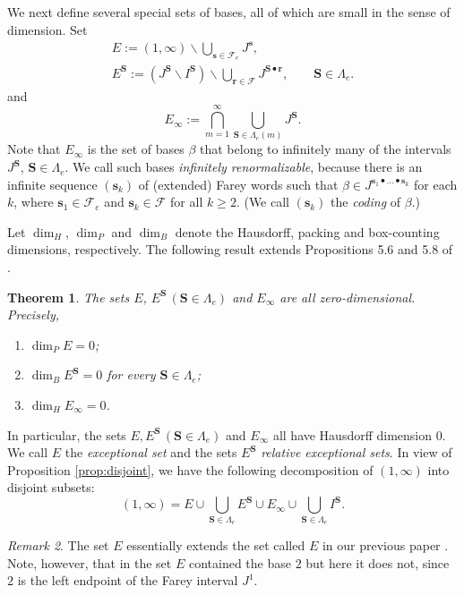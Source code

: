 \documentclass[12pt]{amsart}
\newtheorem{theorem}{Theorem}[section]
\theoremstyle{definition}
\theoremstyle{remark}
\newtheorem{remark}[theorem]{Remark}
\numberwithin{equation}{section}
\newcommand{\cF}{\mathcal{F}}
\newcommand{\s}{ {\mathbf{s}}}
\newcommand{\cs}{ {\mathbf{S}}}
\renewcommand{\r}{ {\mathbf{r}}}
\newcommand{\f}{\infty}
\newcommand{\La}{\Lambda}
\begin{document}
{We next define several special sets of bases, all of which are small in the sense of dimension. Set
\begin{gather*}
E:=(1,\f)\backslash \bigcup_{\s\in \cF_e} J^\s,\\
E^\cs:=(J^\cs\backslash I^\cs)\backslash \bigcup_{\r\in\cF} J^{\cs\bullet\r}, \qquad \cs\in\La_e.
\end{gather*}
and
\[
E_\f:=\bigcap_{m=1}^\f \bigcup_{\cs\in\La_e(m)} J^\cs.
\]
Note that $E_\f$ is the set of bases $\beta$ that belong to infinitely many of the intervals $J^\cs$, $\cs\in\La_e$. We call such bases {\em infinitely renormalizable}, because there is an infinite sequence $(\s_k)$ of (extended) Farey words such that $\beta\in J^{\s_1\bullet\dots\bullet\s_k}$ for each $k$, where $\s_1\in\cF_e$ and $\s_k\in\cF$ for all $k\geq 2$. (We call $(\s_k)$ the {\em coding} of $\beta$.)

Let $\dim_H$, $\dim_P$ and $\dim_B$ denote the Hausdorff, packing and box-counting dimensions, respectively.
The following result extends Propositions 5.6 and 5.8 of \cite{Allaart-Kong-2021}.

\begin{theorem} \label{thm:exceptional-sets}%
The sets $E$, $E^\cs\, (\cs\in\La_e)$ and $E_\f$ are all zero-dimensional. Precisely,
\begin{enumerate} [{\rm(i)}]
\item $\dim_P E=0$;
\item $\dim_B E^\cs=0$ for every $\cs\in\La_e$;
\item $\dim_H E_\f=0$.
\end{enumerate}
\end{theorem}

In particular, the sets $E, E^\cs\, (\cs\in\La_e)$ and $E_\f$ all have Hausdorff dimension $0$. We call $E$ the {\em exceptional set} and the sets $E^\cs$ {\em relative exceptional sets}. In view of Proposition \ref{prop:disjoint}, we have the following decomposition of $(1,\f)$ into disjoint subsets:
\begin{equation} \label{eq:decomposition}
(1,\f)=E\cup \bigcup_{\cs\in\La_e} E^\cs \cup E_\f \cup \bigcup_{\cs\in\La_e} I^\cs.
\end{equation}

\begin{remark}
The set $E$ essentially extends the set called $E$ in our previous paper \cite{Allaart-Kong-2021}. Note, however, that in \cite{Allaart-Kong-2021} the set $E$ contained the base $2$ but here it does not, since $2$ is the left endpoint of the Farey interval $J^1$.
\end{remark}

}
\end{document}
